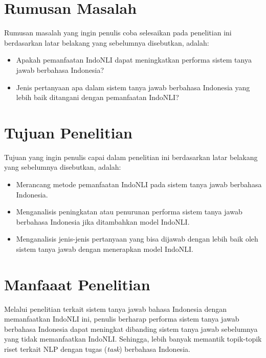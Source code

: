 \section{Rumusan Masalah}
\label{sec:rumusanMasalah}
Rumusan masalah yang ingin penulis coba selesaikan pada penelitian ini berdasarkan latar belakang yang sebelumnya disebutkan, adalah:

\begin{itemize}

    \item Apakah pemanfaatan IndoNLI dapat meningkatkan performa sistem tanya jawab berbahasa Indonesia?

    \item Jenis pertanyaan apa dalam sistem tanya jawab berbahasa Indonesia yang lebih baik ditangani dengan pemanfaatan IndoNLI?
    
\end{itemize}

\section{Tujuan Penelitian}
\label{sec:tujuanPenelitian}
Tujuan yang ingin penulis capai dalam penelitian ini berdasarkan latar belakang yang sebelumnya disebutkan, adalah:

\begin{itemize}

    \item Merancang metode pemanfaatan IndoNLI pada sistem tanya jawab berbahasa Indonesia.

    \item Menganalisis peningkatan atau penurunan performa sistem tanya jawab berbahasa Indonesia jika ditambahkan model IndoNLI.

    \item Menganalisis jenis-jenis pertanyaan yang bisa dijawab dengan lebih baik oleh sistem tanya jawab dengan menerapkan model IndoNLI.
    
\end{itemize}

\section{Manfaaat Penelitian}
Melalui penelitian terkait sistem tanya jawab bahasa Indonesia dengan memanfaatkan IndoNLI ini, penulis berharap performa sistem tanya jawab berbahasa Indonesia dapat meningkat dibanding sistem tanya jawab sebelumnya yang tidak memanfaatkan IndoNLI. Sehingga, lebih banyak memantik topik-topik riset terkait NLP dengan tugas (\emph{task}) berbahasa Indonesia.

